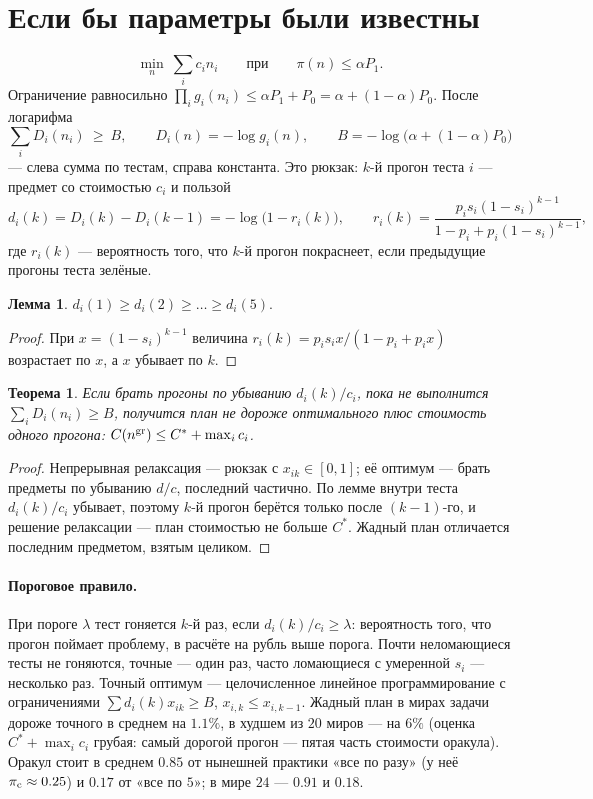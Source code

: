\documentclass[11pt,a4paper]{article}
\theoremstyle{plain}
\newtheorem{theorem}{Теорема}
\theoremstyle{definition}
\newtheorem{lemma}{Лемма}
\begin{document}
\section{Если бы параметры были известны}

\[
\min_n\ \sum_ic_in_i\qquad\text{при}\qquad\pi(n)\le\alpha P_1 .
\]
Ограничение равносильно $\prod_ig_i(n_i)\le\alpha P_1+P_0=\alpha+(1-\alpha)P_0$. После логарифма
\[
\sum_iD_i(n_i)\ \ge\ B,\qquad D_i(n)=-\log g_i(n),\qquad B=-\log\bigl(\alpha+(1-\alpha)P_0\bigr)
\]
--- слева сумма по тестам, справа константа. Это рюкзак: $k$-й прогон теста $i$ --- предмет со стоимостью $c_i$ и пользой
\[
d_i(k)=D_i(k)-D_i(k-1)=-\log\bigl(1-r_i(k)\bigr),\qquad r_i(k)=\frac{p_is_i(1-s_i)^{k-1}}{1-p_i+p_i(1-s_i)^{k-1}},
\]
где $r_i(k)$ --- вероятность того, что $k$-й прогон покраснеет, если предыдущие прогоны теста зелёные.

\begin{lemma}
$d_i(1)\ge d_i(2)\ge\dots\ge d_i(5)$.
\end{lemma}

\begin{proof}
При $x=(1-s_i)^{k-1}$ величина $r_i(k)=p_is_ix/(1-p_i+p_ix)$ возрастает по $x$, а $x$ убывает по $k$.
\end{proof}

\begin{theorem}
Если брать прогоны по убыванию $d_i(k)/c_i$, пока не выполнится $\sum_iD_i(n_i)\ge B$, получится план не дороже оптимального плюс стоимость одного прогона: $C(n^{\rm gr})\le C^*+\max_ic_i$.
\end{theorem}

\begin{proof}
Непрерывная релаксация --- рюкзак с $x_{ik}\in[0,1]$; её оптимум --- брать предметы по убыванию $d/c$, последний частично. По лемме внутри теста $d_i(k)/c_i$ убывает, поэтому $k$-й прогон берётся только после $(k-1)$-го, и решение релаксации --- план стоимостью не больше $C^*$. Жадный план отличается последним предметом, взятым целиком.
\end{proof}

\paragraph{Пороговое правило.} При пороге $\lambda$ тест гоняется $k$-й раз, если $d_i(k)/c_i\ge\lambda$: вероятность того, что прогон поймает проблему, в расчёте на рубль выше порога. Почти неломающиеся тесты не гоняются, точные --- один раз, часто ломающиеся с умеренной $s_i$ --- несколько раз. Точный оптимум --- целочисленное линейное программирование с ограничениями $\sum d_i(k)x_{ik}\ge B$, $x_{i,k}\le x_{i,k-1}$. Жадный план в мирах задачи дороже точного в среднем на $1.1\%$, в худшем из $20$ миров --- на $6\%$ (оценка $C^*+\max_ic_i$ грубая: самый дорогой прогон --- пятая часть стоимости оракула). Оракул стоит в среднем $0.85$ от нынешней практики «все по разу» (у неё $\pi_{\rm c}\approx0.25$) и $0.17$ от «все по $5$»; в мире $24$ --- $0.91$ и $0.18$.
\end{document}
